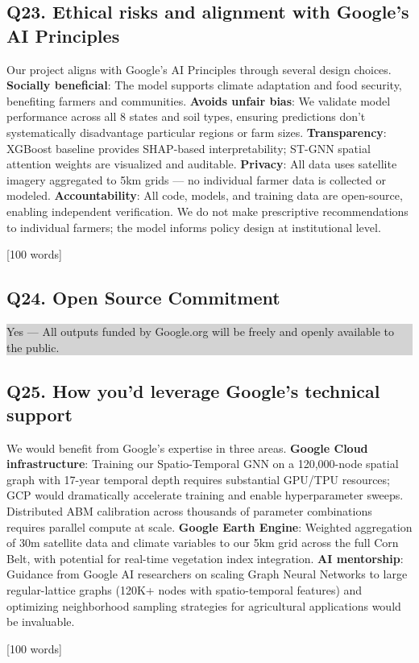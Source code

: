 \documentclass[11pt,letterpaper]{article}
\newcommand{\answer}[1]{%
    \vspace{0.2em}%
    \noindent\colorbox{answerbox}{\parbox{\dimexpr\textwidth-2\fboxsep}{%
        \vspace{0.4em}#1\vspace{0.4em}%
    }}%
    \vspace{0.5em}%
}
\newcommand{\selection}[1]{%
    \vspace{0.2em}%
    \noindent\colorbox{lightgray}{\parbox{\dimexpr\textwidth-2\fboxsep}{%
        \vspace{0.3em}#1\vspace{0.3em}%
    }}%
    \vspace{0.5em}%
}
\newcommand{\wordcount}[1]{%
    \hfill{\scriptsize\textcolor{notegray}{[#1 words]}}%
}
\begin{document}
\subsection{Q23. Ethical risks and alignment with Google's AI Principles}
\answer{Our project aligns with Google's AI Principles through several design choices. \textbf{Socially beneficial}: The model supports climate adaptation and food security, benefiting farmers and communities. \textbf{Avoids unfair bias}: We validate model performance across all 8 states and soil types, ensuring predictions don't systematically disadvantage particular regions or farm sizes. \textbf{Transparency}: XGBoost baseline provides SHAP-based interpretability; ST-GNN spatial attention weights are visualized and auditable. \textbf{Privacy}: All data uses satellite imagery aggregated to 5km grids --- no individual farmer data is collected or modeled. \textbf{Accountability}: All code, models, and training data are open-source, enabling independent verification. We do not make prescriptive recommendations to individual farmers; the model informs policy design at institutional level.}
\wordcount{100}

\subsection{Q24. Open Source Commitment}
\selection{Yes --- All outputs funded by Google.org will be freely and openly available to the public.}

\subsection{Q25. How you'd leverage Google's technical support}
\answer{We would benefit from Google's expertise in three areas. \textbf{Google Cloud infrastructure}: Training our Spatio-Temporal GNN on a 120,000-node spatial graph with 17-year temporal depth requires substantial GPU/TPU resources; GCP would dramatically accelerate training and enable hyperparameter sweeps. Distributed ABM calibration across thousands of parameter combinations requires parallel compute at scale. \textbf{Google Earth Engine}: Weighted aggregation of 30m satellite data and climate variables to our 5km grid across the full Corn Belt, with potential for real-time vegetation index integration. \textbf{AI mentorship}: Guidance from Google AI researchers on scaling Graph Neural Networks to large regular-lattice graphs (120K+ nodes with spatio-temporal features) and optimizing neighborhood sampling strategies for agricultural applications would be invaluable.}
\wordcount{100}
\end{document}
